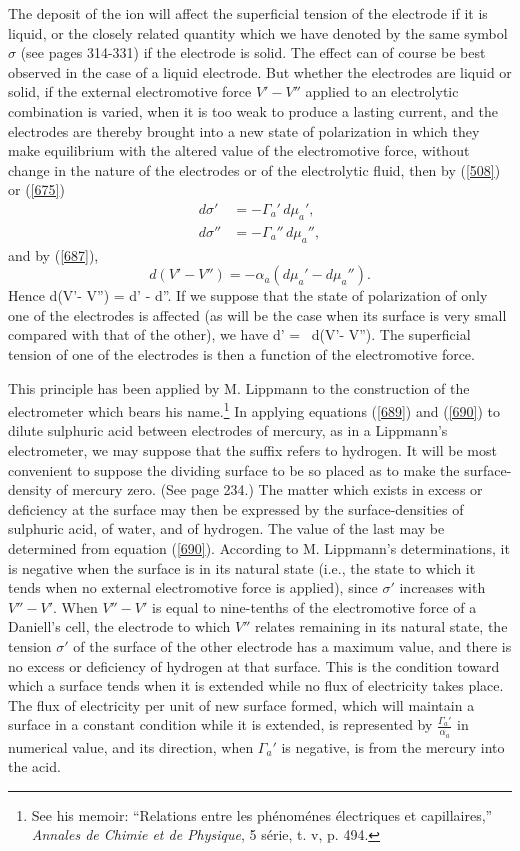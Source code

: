 \documentclass[12pt]{article}
\begin{document}
The deposit of the ion will affect the superficial tension of the electrode if it is liquid, or the closely related quantity which we have denoted by the same symbol $\sigma$ (see pages 314-331) if the electrode is solid. The effect can of course be best observed in the case of a liquid  electrode. But whether the electrodes are liquid or solid, if the external electromotive force $V'- V''$ applied to an electrolytic combination is varied, when it is too weak to produce a lasting current, and the electrodes are thereby brought into a new state of polarization in which they make equilibrium with the altered value of the electromotive force, without change in the nature of the electrodes or of the electrolytic fluid, then by (\ref{508}) or (\ref{675})
\begin{align*}
d\sigma' &= - \Gamma_a'\,d\mu_a', \\
d\sigma'' &= - \Gamma_a''\,d\mu_a'',\end{align*}
and by (\ref{687}),
$$ d( V'- V'') =-\alpha_a(d\mu_a'-d\mu_a'').$$
Hence
\eqs d(V'- V'') =  d\sigma' -  d\sigma''.   \label{689} \eqe
If we suppose that the state of polarization of only one of the electrodes is affected (as will be the case when its surface is very small compared with that of the other), we have
\eqs d\sigma' =   \, d(V'- V'').   \label{690} \eqe
The superficial tension of one of the electrodes is then a function of the electromotive force.

This principle has been applied by M. Lippmann to the construction of the electrometer which bears his name.\footnote{See his memoir: ``Relations entre les ph\'{e}nom\'{e}nes \'{e}lectriques et capillaires,'' \textit{Annales de Chimie et de Physique}, 5 s\'{e}rie, t. v, p. 494.} In applying equations (\ref{689}) and (\ref{690}) to dilute sulphuric acid between electrodes of mercury, as in a Lippmann's electrometer, we may suppose that the suffix refers to hydrogen. It will be most convenient to suppose the dividing surface to be so placed as to make the surface-density of mercury zero. (See page 234.) The matter which exists in excess or deficiency at the surface may then be expressed by the surface-densities of sulphuric acid, of water, and of hydrogen. The value of the last may be determined from equation (\ref{690}). According to M. Lippmann's determinations, it is negative when the surface is in its natural state (i.e., the state to which it tends when no external electromotive force is applied), since $\sigma'$ increases with $V''- V'$. When $V''- V'$ is equal to nine-tenths of the electromotive force of a Daniell's cell, the electrode to which $V''$ relates remaining in its natural state, the tension $\sigma'$ of the surface of the other electrode has a maximum value, and there is no excess or deficiency of hydrogen at that surface. This is the condition toward which a surface tends when it is extended while no flux of electricity takes place. The flux of electricity per unit of new surface formed, which will maintain a surface in a constant condition while it is extended, is represented by $\frac{\Gamma_a'}{\alpha_a}$ in numerical value, and its direction, when $\Gamma_a'$ is negative, is from the mercury into the acid.
\end{document}

